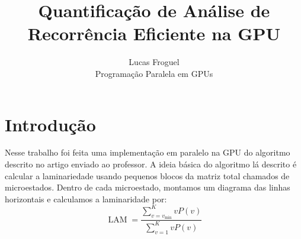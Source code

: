 \documentclass[12pt]{article}
\title{Quantificação de Análise de Recorrência Eficiente na GPU}
\author{Lucas Froguel\\ Programação Paralela em GPUs}
\date{}
\def\be{\begin{equation}}
\def\ee{\end{equation}}
\def\f{\frac}
\theoremstyle{definition}
\DeclareMathOperator{\LAM}{LAM}
\begin{document}
	\maketitle
	
	\section{Introdução}
	
	Nesse trabalho foi feita uma implementação em paralelo na GPU do algoritmo descrito no artigo enviado ao professor. A ideia básica do algoritmo lá descrito é calcular a laminariedade usando pequenos blocos da matriz total chamados de microestados. Dentro de cada microestado, montamos um diagrama das linhas horizontais e calculamos a laminaridade por:
	\be\label{eq1}
		\LAM = \f{\sum_{v=v_\text{min}}^K vP(v)}{\sum_{v=1}^K vP(v)}
	\ee
	
\end{document}

